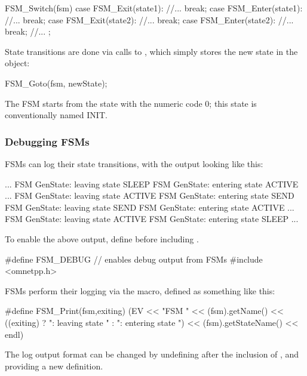 \begin{cpp}
FSM_Switch(fsm)
{
  case FSM_Exit(state1):
    //...
    break;
  case FSM_Enter(state1):
    //...
    break;
  case FSM_Exit(state2):
    //...
    break;
  case FSM_Enter(state2):
    //...
    break;
  //...
};
\end{cpp}


State transitions are done via calls to , which simply stores
the new state in the  object:

\begin{cpp}
FSM_Goto(fsm, newState);
\end{cpp}

The FSM starts from the state with the numeric code 0; this state
is conventionally named INIT.


\subsubsection{Debugging FSMs}
\label{sec:simple-modules:debugging-fsms}

FSMs can log their state transitions, with the output looking like this:

\begin{filelisting}
...
FSM GenState: leaving state SLEEP
FSM GenState: entering state ACTIVE
...
FSM GenState: leaving state ACTIVE
FSM GenState: entering state SEND
FSM GenState: leaving state SEND
FSM GenState: entering state ACTIVE
...
FSM GenState: leaving state ACTIVE
FSM GenState: entering state SLEEP
...
\end{filelisting}

To enable the above output, define  before including .

\begin{cpp}
#define FSM_DEBUG    // enables debug output from FSMs
#include <omnetpp.h>
\end{cpp}

FSMs perform their logging via the  macro, defined as something like this:

\begin{cpp}
#define FSM_Print(fsm,exiting)
  (EV << "FSM " << (fsm).getName()
      << ((exiting) ? ": leaving state " : ": entering state ")
      << (fsm).getStateName() << endl)
\end{cpp}

The log output format can be changed by undefining  after the
inclusion of , and providing a new definition.


